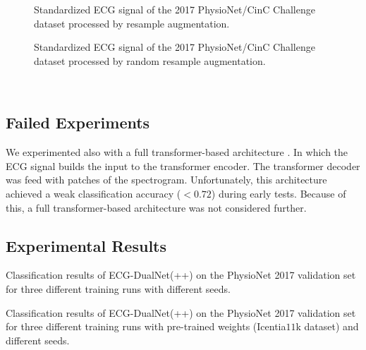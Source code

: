 \begin{figure}[!ht]
    \setlength{\figH}{4cm}
    \setlength{\figW}{88.9mm}
    \centering
    
    \caption{Standardized ECG signal of the 2017 PhysioNet/CinC Challenge dataset \cite{Clifford2017} processed by resample augmentation.}
    \label{fig:aug_resample}
\end{figure}

\begin{figure}[!ht]
    \setlength{\figH}{4cm}
    \setlength{\figW}{88.9mm}
    \centering
    
    \caption{Standardized ECG signal of the 2017 PhysioNet/CinC Challenge dataset \cite{Clifford2017} processed by random resample augmentation.}
    \label{fig:aug_random_resample}
\end{figure}

\newpage
\ 
\newpage

\subsection{Failed Experiments} \label{subsec:failed_experiments}

We experimented also with a full transformer-based architecture \cite{Vaswani2017}. In which the ECG signal builds the input to the transformer encoder. The transformer decoder was feed with patches of the spectrogram. Unfortunately, this architecture achieved a weak classification accuracy ($<0.72$) during early tests. Because of this, a full transformer-based architecture was not considered further.

\subsection{Experimental Results} \label{subsec:experimental_results}

\begin{table}[!ht]
    \centering
    \caption{Classification results of ECG-DualNet(++) on the PhysioNet 2017 validation set for three different training runs with different seeds.}
    
    \label{tab:full_results}
\end{table}

\begin{table}[!ht]
    \centering
    \caption{Classification results of ECG-DualNet(++) on the PhysioNet 2017 validation set for three different training runs with pre-trained weights (Icentia$11$k dataset) and different seeds.}
    
    \label{tab:full_pretraining_results}
\end{table}

